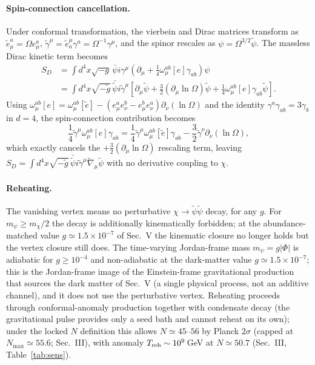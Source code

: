 \documentclass[pdflatex,sn-mathphys-num]{sn-jnl}
\providecommand{\gtrsim}{\geq}
\theoremstyle{thmstyleone}
\begin{document}
\begin{appendices}
\paragraph{Spin-connection cancellation.} Under conformal transformation, the vierbein and Dirac matrices transform as $\tilde e^a_\mu=\Omega e^a_\mu$, $\tilde\gamma^\mu=\tilde e^\mu_a\gamma^a=\Omega^{-1}\gamma^\mu$, and the spinor rescales as $\psi=\Omega^{3/2}\tilde\psi$. The massless Dirac kinetic term becomes
\begin{equation}
\begin{aligned}
S_D&=\int d^4x\sqrt{-g}\,\bar\psi i\gamma^\mu\left(\partial_\mu+\tfrac14\omega^{ab}_\mu[e]\gamma_{ab}\right)\psi\\
&=\int d^4x\sqrt{-\tilde g}\,\bar{\tilde\psi}i\tilde\gamma^\mu\left[\partial_\mu\tilde\psi+\frac32(\partial_\mu\ln\Omega)\tilde\psi+\frac14\omega^{ab}_\mu[e]\gamma_{ab}\tilde\psi\right].
\end{aligned}
\label{eq:B3}
\end{equation}
Using $\omega^{ab}_\mu[e]=\omega^{ab}_\mu[\tilde e]-(e^a_\mu e^b_\nu-e^b_\mu e^a_\nu)\partial_\nu(\ln\Omega)$ and the identity $\gamma^a\gamma_{ab}=3\gamma_b$ in $d=4$, the spin-connection contribution becomes
\begin{equation}
\frac14\tilde\gamma^\mu\omega^{ab}_\mu[e]\gamma_{ab}
=\frac14\tilde\gamma^\mu\omega^{ab}_\mu[\tilde e]\gamma_{ab}-\frac32\tilde\gamma^\nu\partial_\nu(\ln\Omega),
\label{eq:B5}
\end{equation}
which exactly cancels the $+\frac32(\partial_\mu\ln\Omega)$ rescaling term, leaving $S_D=\int d^4x\sqrt{-\tilde g}\,\bar{\tilde\psi}i\tilde\gamma^\mu\tilde\nabla_\mu\tilde\psi$ with no derivative coupling to $\chi$.

\paragraph{Reheating.} The vanishing vertex means no perturbative $\chi\to\tilde\psi\tilde\psi$ decay, for any $g$. For $m_\psi\gtrsim m_\chi/2$ the decay is additionally kinematically forbidden; at the abundance-matched value $g\simeq1.5\times10^{-7}$ of Sec.~V the kinematic closure no longer holds but the vertex closure still does. The time-varying Jordan-frame mass $m_\psi=g|\Phi|$ is adiabatic for $g\gtrsim10^{-4}$ and non-adiabatic at the dark-matter value $g\simeq1.5\times10^{-7}$; this is the Jordan-frame image of the Einstein-frame gravitational production that sources the dark matter of Sec.~V (a single physical process, not an additive channel), and it does not use the perturbative vertex. Reheating proceeds through conformal-anomaly production together with condensate decay (the gravitational pulse provides only a seed bath and cannot reheat on its own); under the locked $N$ definition this allows $N\simeq45$--$56$ by Planck $2\sigma$ (capped at $N_{\max}\simeq55.6$; Sec.~III), with anomaly $T_{\rm reh}\sim10^9\,$GeV at $N\simeq50.7$ (Sec.~III, Table~\ref{tab:sens}).


\end{appendices}
\end{document}
